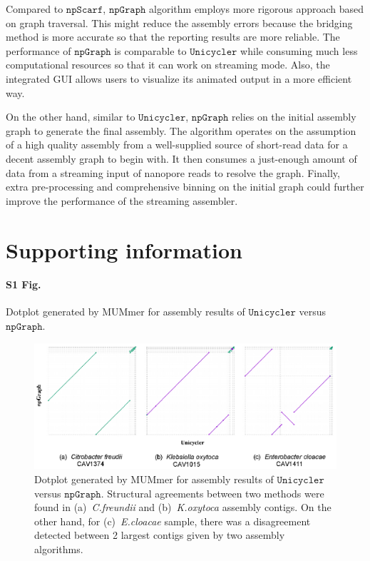 \documentclass[10pt,letterpaper]{article}
\renewcommand{\figurename}{Fig}
\newcommand{\npscarf}{$\mathtt{npScarf}$}
\newcommand{\npgraph}{$\mathtt{npGraph}$}
\newcommand{\unicycler}{$\mathtt{Unicycler}$}
\begin{document}
Compared to \npscarf, \npgraph{} algorithm employs more rigorous approach based on graph traversal. This might reduce the assembly errors because the bridging method is more accurate so that the reporting results are more reliable.
The performance of \npgraph{} is comparable to \unicycler{} while consuming much less computational resources so that it can work on streaming mode. 
Also, the integrated GUI allows users to visualize its animated output in a  more efficient way.

On the other hand, similar to \unicycler{}, \npgraph{} relies on the initial assembly graph to generate the final assembly. The algorithm operates on the assumption of a high quality assembly from a well-supplied source of short-read data for a decent assembly graph to begin with.
It then consumes a just-enough amount of data from a streaming input of nanopore reads to resolve the graph. 
Finally, extra pre-processing and comprehensive binning on the initial graph could further improve the performance of the streaming assembler.


\section*{Supporting information}
\renewcommand{\figurename}{Supporting Figure}
\renewcommand{\tablename}{Supporting Table}
\renewcommand\thefigure{S\arabic{figure}}    
\setcounter{figure}{0}    

\paragraph*{S1 Fig.}
\label{S1_Fig} Dotplot generated by MUMmer for assembly results of \unicycler{} versus \npgraph{}.

\begin{figure}[!ht]
 \includegraphics[width=\textwidth]{images/FigS1.eps}
 \caption{Dotplot generated by MUMmer for assembly results of \unicycler{} versus \npgraph{}. Structural agreements between two methods were found in (a)~\emph{C.freundii} and (b)~\emph{K.oxytoca} assembly contigs. On the other hand, for (c)~\emph{E.cloacae} sample, there was a disagreement detected between 2 largest contigs given by two assembly algorithms.}
\end{figure}
\end{document}

